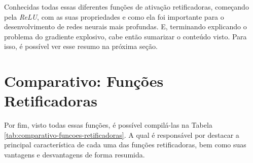 Conhecidas todas essas diferentes funções de ativação retificadoras, começando pela \textit{ReLU}, com as suas propriedades e como ela foi importante para o desenvolvimento de redes neurais mais profundas. E, terminando explicando o problema do gradiente explosivo, cabe então sumarizar o conteúdo visto. Para isso, é possível ver esse resumo na próxima seção.

\section{Comparativo: Funções Retificadoras}

Por fim, visto todas essas funções, é possível compilá-las na Tabela \ref{tab:comparativo-funcoes-retificadoras}. A qual é responsável por destacar a principal característica de cada uma das funções retificadoras, bem como suas vantagens e desvantagens de forma resumida.

